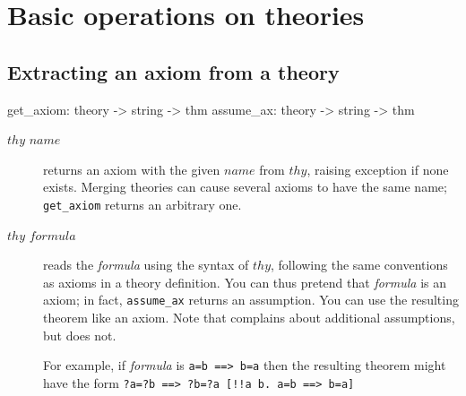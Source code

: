 

\section{Basic operations on theories}
\subsection{Extracting an axiom from a theory}
\begin{ttbox} 
get_axiom: theory -> string -> thm
assume_ax: theory -> string -> thm
\end{ttbox}
\begin{description}
\item[ $thy$ $name$] 
returns an axiom with the given $name$ from $thy$, raising exception
 if none exists.  Merging theories can cause several axioms
to have the same name; {\tt get_axiom} returns an arbitrary one.

\item[ $thy$ $formula$] 
reads the {\it formula} using the syntax of $thy$, following the same
conventions as axioms in a theory definition.  You can thus pretend that
{\it formula} is an axiom; in fact, {\tt assume_ax} returns an assumption.
You can use the resulting theorem like an axiom.  Note that 
 complains about additional assumptions, but 
 does not.

For example, if {\it formula} is
\hbox{\tt a=b ==> b=a} then the resulting theorem might have the form
\hbox{\tt\frenchspacing ?a=?b ==> ?b=?a  [!!a b. a=b ==> b=a]}
\end{description}


